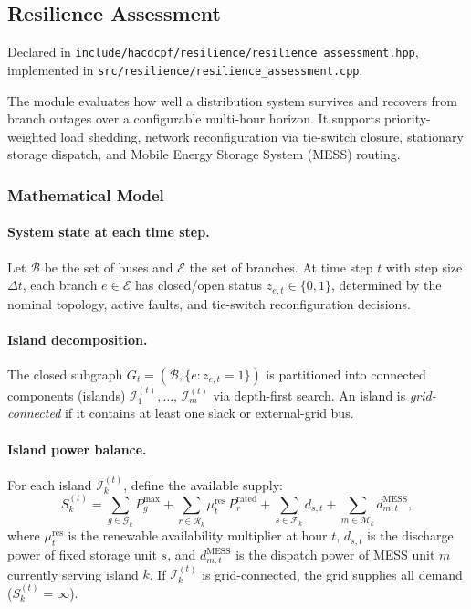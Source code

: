 \subsection{Resilience Assessment}
\label{sec:resilience}

Declared in \texttt{include/hacdcpf/resilience/resilience\_assess\-ment.hpp},
implemented in \texttt{src/resilience/resilience\_assessment.cpp}.

The module evaluates how well a distribution system survives and recovers
from branch outages over a configurable multi-hour horizon.  It supports
priority-weighted load shedding, network reconfiguration via tie-switch
closure, stationary storage dispatch, and Mobile Energy Storage System
(MESS) routing.

\subsubsection{Mathematical Model}
\label{sec:resilience-math}

\paragraph{System state at each time step.}
Let $\mathcal{B}$ be the set of buses and $\mathcal{E}$ the set of branches.
At time step $t$ with step size $\Delta t$, each branch $e\in\mathcal{E}$ has
closed/open status $z_{e,t}\in\{0,1\}$, determined by the nominal topology,
active faults, and tie-switch reconfiguration decisions.

\paragraph{Island decomposition.}
The closed subgraph $G_t = (\mathcal{B}, \{e : z_{e,t}=1\})$ is partitioned
into connected components (islands) $\mathcal{I}_1^{(t)},\ldots$,
$\mathcal{I}_m^{(t)}$ via depth-first search.  An island is \emph{grid-connected}
if it contains at least one slack or external-grid bus.

\paragraph{Island power balance.}
For each island $\mathcal{I}_k^{(t)}$, define the available supply:
\begin{equation}
  S_k^{(t)} =
    \sum_{g\in\mathcal{G}_k} P_g^{\max}
    + \sum_{r\in\mathcal{R}_k} \mu_t^{\text{res}}\,P_r^{\text{rated}}
    + \sum_{s\in\mathcal{F}_k} d_{s,t}
    + \sum_{m\in\mathcal{M}_k} d_{m,t}^{\text{MESS}},
  \label{eq:res-supply}
\end{equation}
where $\mu_t^{\text{res}}$ is the renewable availability multiplier at hour $t$,
$d_{s,t}$ is the discharge power of fixed storage unit $s$, and
$d_{m,t}^{\text{MESS}}$ is the dispatch power of MESS unit $m$ currently
serving island $k$.  If $\mathcal{I}_k^{(t)}$ is grid-connected, the grid
supplies all demand ($S_k^{(t)} = \infty$).

